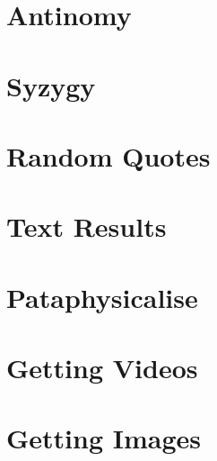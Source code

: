 \section{Antinomy}



\section{Syzygy}



\section{Random Quotes}



\section{Text Results}



\section{Pataphysicalise}



\section{Getting Videos}



\section{Getting Images}


